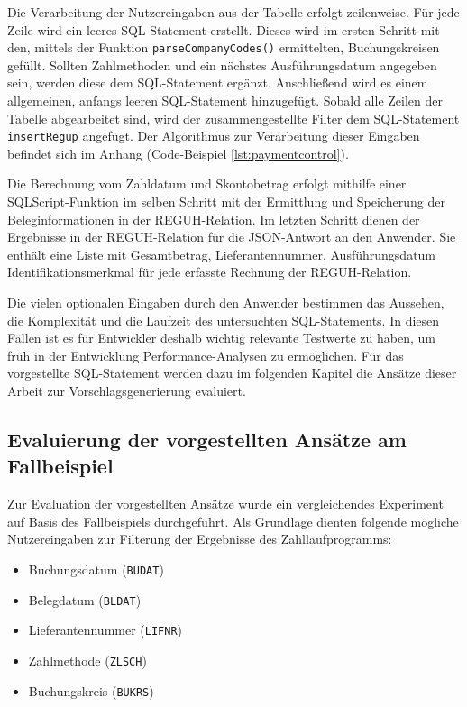 Die Verarbeitung der Nutzereingaben aus der Tabelle erfolgt zeilenweise.
Für jede Zeile wird ein leeres SQL-Statement erstellt.
Dieses wird im ersten Schritt mit den, mittels der Funktion \texttt{parseCompanyCodes()} ermittelten, Buchungskreisen gefüllt.
Sollten Zahlmethoden und ein nächstes Ausführungsdatum angegeben sein, werden diese dem SQL-Statement ergänzt.
Anschließend wird es einem allgemeinen, anfangs leeren SQL-Statement hinzugefügt.
Sobald alle Zeilen der Tabelle abgearbeitet sind, wird der zusammengestellte Filter dem SQL-Statement \texttt{insertRegup} angefügt.
Der Algorithmus zur Verarbeitung dieser Eingaben befindet sich im Anhang (Code-Beispiel \ref{lst:paymentcontrol}).

Die Berechnung vom Zahldatum und Skontobetrag erfolgt mithilfe einer SQLScript-Funktion im selben Schritt mit der Ermittlung und Speicherung der Beleginformationen in der REGUH-Relation.
Im letzten Schritt dienen der Ergebnisse in der REGUH-Relation für die JSON-Antwort an den Anwender.
Sie enthält eine Liste mit Gesamtbetrag, Lieferantennummer, Ausführungsdatum Identifikationsmerkmal für jede erfasste Rechnung der REGUH-Relation.

Die vielen optionalen Eingaben durch den Anwender bestimmen das Aussehen, die Komplexität und die Laufzeit des untersuchten SQL-Statements.
In diesen Fällen ist es für Entwickler deshalb wichtig relevante Testwerte zu haben, um früh in der Entwicklung Performance-Analysen zu ermöglichen.
Für das vorgestellte SQL-Statement werden dazu im folgenden Kapitel die Ansätze dieser Arbeit zur Vorschlagsgenerierung evaluiert.

\subsection{Evaluierung der vorgestellten Ansätze am Fallbeispiel}
Zur Evaluation der vorgestellten Ansätze wurde ein vergleichendes Experiment auf Basis des Fallbeispiels durchgeführt.
Als Grundlage dienten folgende mögliche Nutzereingaben zur Filterung der Ergebnisse des Zahllaufprogramms:

   \begin{itemize}
      \item Buchungsdatum (\texttt{BUDAT})
      \item Belegdatum (\texttt{BLDAT})
			\item Lieferantennummer (\texttt{LIFNR})
			\item Zahlmethode (\texttt{ZLSCH})
			\item Buchungskreis (\texttt{BUKRS})
   \end{itemize}
	
